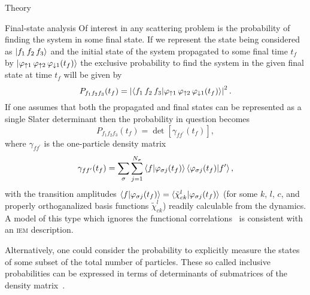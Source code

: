 \documentclass[aps, pra, reprint, groupedaddress, amsfonts, longbibliography,
               amsmath, amssymb, showpacs, nofootinbib]{revtex4-1}
\begin{document}
\begin{section}{Theory \label{sec:theory}}
\begin{subsection}{Final-state analysis \label{sec:probs}}
      Of interest in any scattering problem is the probability of finding the system in some final state.
      If we represent the state being considered as $\ket{f_1 \, f_2 \, f_3}$ and the initial state of
      the system propagated to some final time $t_f$ by $\ket{\varphi_{ \uparrow 1} \,
      \varphi_{\uparrow 2} \, \varphi_{\downarrow 1} (t_f)}$ the exclusive probability to find the
      system in the given final state at time $t_f$ will be given by
      \begin{equation} \label{eq:finalProb}
         P_{f_1 f_2 f_3}(t_f) = \left| \braket{ f_1 \, f_2 \, f_3 | \varphi_{ \uparrow 1} \,
                                       \varphi_{\uparrow 2} \, \varphi_{\downarrow 1} (t_f) } \right|^2.
      \end{equation}
      If one assumes that both the propagated and final states can be represented as a single Slater
      determinant then the probability in question becomes
      \begin{equation} \label{eq:detProb}
         P_{f_1 f_2 f_3}(t_f) = \det \left[ \gamma_{f f^\prime}(t_f) \right],
      \end{equation}
      where $\gamma_{f f^\prime}$ is the one-particle density matrix
      \begin{equation} \label{eq:denmat}
         \gamma_{f f^\prime}(t_f) = \sum\limits_{\sigma} \sum\limits_{j = 1}^{N_\sigma}
                               \braket{f | \varphi_{\sigma j}(t_f)}
                               \braket{\varphi_{\sigma j}(t_f) | f^\prime},
      \end{equation}
      with the transition amplitudes $\braket{f | \varphi_{\sigma j}(t_f)} =
      \braket{\tilde{\chi}^l_{c k} | \varphi_{\sigma j}(t_f)}$ (for some $k$, $l$, $c$, and properly
      orthoganalized basis functions $\tilde{\chi}^l_{c k}$) readily calculable from the dynamics. A
      model of this type which ignores the functional correlations~\cite{p-he2p-he} is consistent with
      an \textsc{iem} description.

      Alternatively, one could consider the probability to explicitly measure the states of some subset
      of the total number of particles. These so called inclusive probabilities can be expressed in
      terms of determinants of submatrices of the density matrix~\cite{inc-prob}.
 

\end{subsection}
\end{section}
\end{document}
